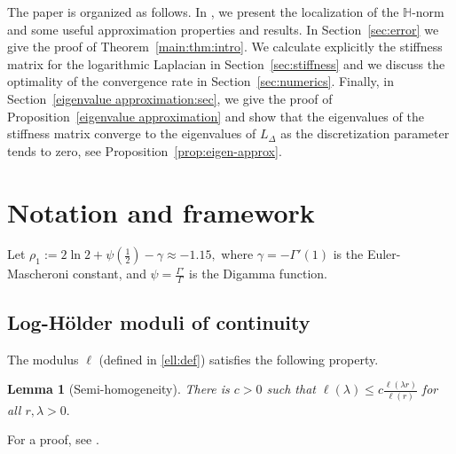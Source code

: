 \documentclass[11 pt]{article}
\newtheorem{lemma}[theorem]{Lemma}
\numberwithin{equation}{section}
\begin{document}
The paper is organized as follows. In , we present the localization of the $\mathbb{H}$-norm and some useful approximation properties and results. In Section~\ref{sec:error} we give the proof of Theorem~\ref{main:thm:intro}. We calculate explicitly the stiffness matrix for the logarithmic Laplacian in Section~\ref{sec:stiffness} and we discuss the optimality of the convergence rate in Section~\ref{sec:numerics}. Finally, in Section~\ref{eigenvalue approximation:sec}, we give the proof of Proposition~\ref{eigenvalue approximation} and show that the eigenvalues of the stiffness matrix converge to the eigenvalues of $L_{\Delta}$ as the discretization parameter tends to zero, see Proposition~\ref{prop:eigen-approx}.


\section{Notation and framework} \label{sec:notation}

Let $\rho_1:=2\ln 2 + \psi(\tfrac{1}{2})-\gamma\approx -1.15,$ where $\gamma=-\Gamma'(1)$ is the Euler-Mascheroni constant, and $\psi=\frac{\Gamma'}{\Gamma}$ is the Digamma function.

\subsection{Log-Hölder moduli of continuity}

The modulus $\ell$ (defined in \eqref{ell:def}) satisfies the following property.

\begin{lemma}[Semi-homogeneity]\label{prop1}
There is $c>0$ such that $\ell(\lambda)\leq c\frac{\ell(\lambda r)}{\ell(r)}$ for all $r,\lambda >0.$
\end{lemma}
For a proof, see \cite[Lemma 3.2]{CS22}.
\end{document}
